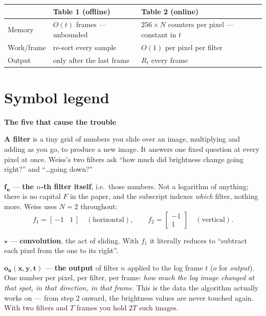\documentclass[11pt]{article}
\newcommand{\step}[1]{\smallskip\par\noindent\textbf{\textcolor{amber}{#1}}\par\nobreak}
\begin{document}
\vspace{-0.4em}
\noindent\begin{tabular}{@{}l l l@{}}
\toprule
 & \textbf{Table 1 (offline)} & \textbf{Table 2 (online)} \\
\midrule
Memory      & $O(t)$ frames --- unbounded          & $256 \times N$ counters per pixel --- constant in $t$ \\
Work/frame  & re-sort every sample                 & $O(1)$ per pixel per filter \\
Output      & only after the last frame            & $R_t$ every frame \\
\bottomrule
\end{tabular}

\section{Symbol legend}

\step{The five that cause the trouble}

\noindent\textbf{A filter} is a tiny grid of numbers you slide over an image, multiplying and adding as you go,
to produce a new image. It answers one fixed question at every pixel at once. Weiss's two filters ask
``how much did brightness change going right?'' and ``\dots going down?''

\medskip
\noindent$\boldsymbol{f_n}$ --- \textbf{the $n$-th filter itself}, i.e.\ those numbers. Not a logarithm of
anything; there is no capital $F$ in the paper, and the subscript indexes \emph{which} filter, nothing more.
Weiss uses $N=2$ throughout:
\[
  f_1 = [\,{-1}\;\;\;1\,] \quad(\text{horizontal}), \qquad
  f_2 = \begin{bmatrix} -1 \\ 1 \end{bmatrix} \quad(\text{vertical}).
\]

\medskip
\noindent$\boldsymbol{\star}$ --- \textbf{convolution}, the act of sliding. With $f_1$ it literally reduces to
``subtract each pixel from the one to its right''.

\medskip
\noindent$\boldsymbol{o_n(x,y,t)}$ --- \textbf{the output} of filter $n$ applied to the log frame $t$
($o$ for \emph{output}). One number per pixel, per filter, per frame: \emph{how much the log image changed at
that spot, in that direction, in that frame}. This is the data the algorithm actually works on --- from step 2
onward, the brightness values are never touched again. With two filters and $T$ frames you hold $2T$ such
images.
\end{document}
